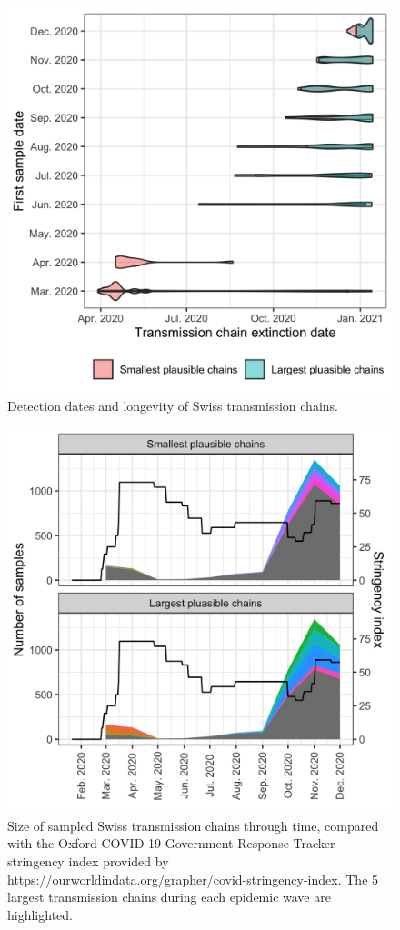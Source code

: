 \documentclass[9pt,twocolumn,twoside,lineno]{pnas-new}
\begin{document}
\begin{figure}[tbhp]
\centering
\includegraphics[width=.8\linewidth]{figures/fig_1_chain_longevity.png}
\caption{Detection dates and longevity of Swiss transmission chains.}
\label{fig:chain-description}
\end{figure}

\begin{figure}[tbhp]
\centering
\includegraphics[width=.8\linewidth]{figures/fig_1_chains_through_time.png}
\caption{Size of sampled Swiss transmission chains through time, compared with the Oxford COVID-19 Government Response Tracker stringency index provided by https://ourworldindata.org/grapher/covid-stringency-index. The 5 largest transmission chains during each epidemic wave are highlighted.}  
\label{fig:chain-description-v2}
\end{figure}
\end{document}
